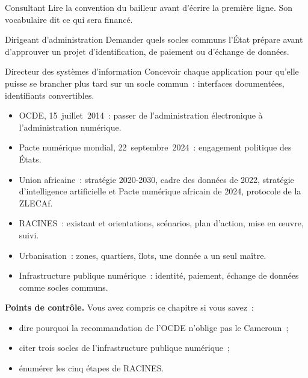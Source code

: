 \begin{boxmetier}{Consultant}
Lire la convention du bailleur avant d'écrire la première ligne. Son vocabulaire dit ce qui sera financé.
\end{boxmetier}

\begin{boxmetier}{Dirigeant d'administration}
Demander quels socles communs l'État prépare avant d'approuver un projet d'identification, de paiement ou d'échange de données.
\end{boxmetier}

\begin{boxmetier}{Directeur des systèmes d'information}
Concevoir chaque application pour qu'elle puisse se brancher plus tard sur un socle commun~: interfaces documentées, identifiants convertibles.
\end{boxmetier}

\begin{boxresume}
\begin{itemize}
    \item OCDE, 15~juillet~2014~: passer de l'administration électronique à l'administration numérique.
    \item Pacte numérique mondial, 22~septembre~2024~: engagement politique des États.
    \item Union africaine~: stratégie 2020-2030, cadre des données de 2022, stratégie d'intelligence artificielle et Pacte numérique africain de 2024, protocole de la ZLECAf.
    \item RACINES~: existant et orientations, scénarios, plan d'action, mise en œuvre, suivi.
    \item Urbanisation~: zones, quartiers, îlots, une donnée a un seul maître.
    \item Infrastructure publique numérique~: identité, paiement, échange de données comme socles communs.
\end{itemize}
\end{boxresume}

\begin{boxinfo}
\textbf{Points de contrôle.} Vous avez compris ce chapitre si vous savez~:
\begin{itemize}
    \item dire pourquoi la recommandation de l'OCDE n'oblige pas le Cameroun~;
    \item citer trois socles de l'infrastructure publique numérique~;
    \item énumérer les cinq étapes de RACINES.
\end{itemize}
\end{boxinfo}

